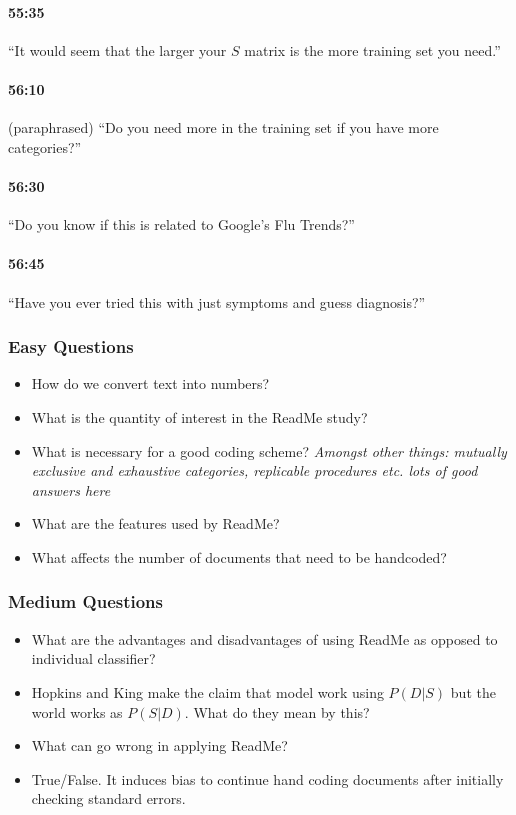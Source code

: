 \documentclass[11pt]{article}
\begin{document}
\paragraph{55:35} ``It would seem that the larger your $S$ matrix is the more training set you need.''

\paragraph{56:10} (paraphrased) ``Do you need more in the training set if you have more categories?''

\paragraph{56:30} ``Do you know if this is related to Google's Flu Trends?''

\paragraph{56:45} ``Have you ever tried this with just symptoms and guess diagnosis?''
\subsubsection{Easy Questions}
\begin{itemize}
\item How do we convert text into numbers?
\item What is the quantity of interest in the ReadMe study?
\item What is necessary for a good coding scheme? \textit{Amongst other things: mutually exclusive and exhaustive categories, replicable procedures etc. lots of good answers here}
\item What are the features used by ReadMe?
\item What affects the number of documents that need to be handcoded?
\end{itemize}

\subsubsection{Medium Questions}

\begin{itemize}
\item What are the advantages and disadvantages of using ReadMe as opposed to individual classifier?
\item Hopkins and King make the claim that model work using $P(D|S)$ but the world works as $P(S|D)$.  What do they mean by this?
\item What can go wrong in applying ReadMe?
\item True/False. It induces bias to continue hand coding documents after initially checking standard errors.
\end{itemize}
\end{document}
